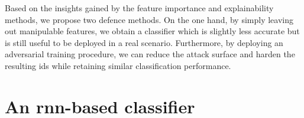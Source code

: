 \documentclass[conference]{IEEEtran}
\begin{document}
Based on the insights gained by the feature importance and explainability methods, we propose two defence methods.
On the one hand, by simply leaving out manipulable features, we obtain a classifier which is slightly less accurate but is still useful to be deployed in a real scenario. Furthermore,
by deploying an adversarial training procedure,
we can reduce the attack surface and harden the resulting \gls{ids} while retaining similar classification performance. %

\section{An \gls{rnn}-based classifier}
\end{document}
